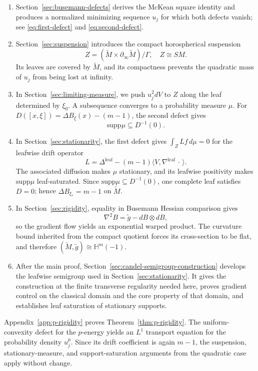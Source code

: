 \documentclass[12pt]{amsart}
\theoremstyle{definition}
\numberwithin{equation}{section}
\newcommand{\wti}{\widetilde}
\newcommand{\bH}{\mathbb{H}}
\newcommand{\supp}{\mathrm{supp}}
\begin{document}
\begin{enumerate}[label=\textup{(\arabic*)}]
\item Section~\ref{sec:busemann-defects} derives the McKean square
identity and produces a normalized minimizing sequence \(u_j\) for which
both defects vanish; see \eqref{eq:first-defect} and
\eqref{eq:second-defect}.

\item Section~\ref{sec:suspension} introduces the compact horospherical
suspension
\[
  Z=(\wti M\times\partial_\infty\wti M)/\Gamma,
  \quad Z\cong SM.
\]
Its leaves are covered by \(\wti M\), and its compactness prevents the
quadratic mass of \(u_j\) from being lost at infinity.

\item In Section~\ref{sec:limiting-measure}, we push \(u_j^2dV\) to \(Z\) along
the leaf determined by \(\xi_0\).  A subsequence converges to a probability
measure \(\mu\).  For
\(D([x,\xi])=\Delta B_\xi(x)-(m-1)\), the second defect gives
\[
  \supp\mu\subseteq D^{-1}(0).
\]

\item In Section~\ref{sec:stationarity}, the first defect gives
\(\int_ZLf\,d\mu=0\) for the leafwise drift operator
\[
  L=\Delta^{\mathrm{leaf}}
    -(m-1)\langle V,\nabla^{\mathrm{leaf}}\,\cdot\,\rangle.
\]
The associated diffusion makes \(\mu\) stationary, and its leafwise
positivity makes \(\supp\mu\) leaf-saturated.  Since
\(\supp\mu\subseteq D^{-1}(0)\), one complete leaf satisfies \(D=0\);
hence \(\Delta B_{\xi_*}=m-1\) on \(\wti M\).

\item In Section~\ref{sec:rigidity}, equality in Busemann Hessian comparison
gives
\[
  \nabla^2B=\wti g-dB\otimes dB,
\]
so the gradient flow yields an exponential warped product.  The curvature
bound inherited from the compact quotient forces its cross-section to be
flat, and therefore \((\wti M,\wti g)\cong\bH^m(-1)\).

\item After the main proof, Section~\ref{sec:candel-semigroup-construction}
develops the leafwise semigroup used in
Section~\ref{sec:stationarity}.  It gives the construction at the finite
transverse regularity needed here, proves gradient control on the
classical domain and the core property of that domain, and establishes
leaf saturation of stationary supports.
\end{enumerate}

Appendix~\ref{app:p-rigidity} proves
Theorem~\ref{thm:p-rigidity}.  The uniform-convexity defect for the
\(p\)-energy yields an \(L^1\) transport equation for the probability
density \(u_j^p\).  Since its drift coefficient is again \(m-1\), the
suspension, stationary-measure, and support-saturation arguments from the
quadratic case apply without change.
\end{document}
